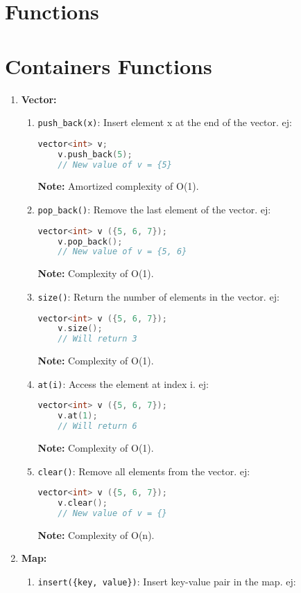 \section{Functions}
\section*{Containers Functions}
\begin{enumerate}
  \item \textbf{Vector:}
    \begin{enumerate}
      \item \texttt{push\_back(x)}: Insert element x at the end of the vector. ej:
	\begin{lstlisting}[language=C++]
	vector<int> v;
	v.push_back(5);
	// New value of v = {5}
	\end{lstlisting}
	\textbf{Note:} Amortized complexity of O(1).
      \item \texttt{pop\_back()}: Remove the last element of the vector. ej:
	\begin{lstlisting}[language=C++]
	vector<int> v ({5, 6, 7});
	v.pop_back();
	// New value of v = {5, 6}
	\end{lstlisting}
	\textbf{Note:} Complexity of O(1).
      \item \texttt{size()}: Return the number of elements in the vector. ej:
	\begin{lstlisting}[language=C++]
	vector<int> v ({5, 6, 7});
	v.size();
	// Will return 3
	\end{lstlisting}
	\textbf{Note:} Complexity of O(1).
      \item \texttt{at(i)}: Access the element at index i. ej:
	\begin{lstlisting}[language=C++]
	vector<int> v ({5, 6, 7});
	v.at(1);
	// Will return 6
	\end{lstlisting}
	\textbf{Note:} Complexity of O(1).
      \item \texttt{clear()}: Remove all elements from the vector. ej:
	\begin{lstlisting}[language=C++]
	vector<int> v ({5, 6, 7});
	v.clear();
	// New value of v = {}
	\end{lstlisting}
	\textbf{Note:} Complexity of O(n).
    \end{enumerate}
  \item \textbf{Map:}
    \begin{enumerate}
      \item \texttt{insert(\{key, value\})}: Insert key-value pair in the map. ej:
	\begin{lstlisting}[language=C++]

\end{lstlisting}
\end{enumerate}
\end{enumerate}
